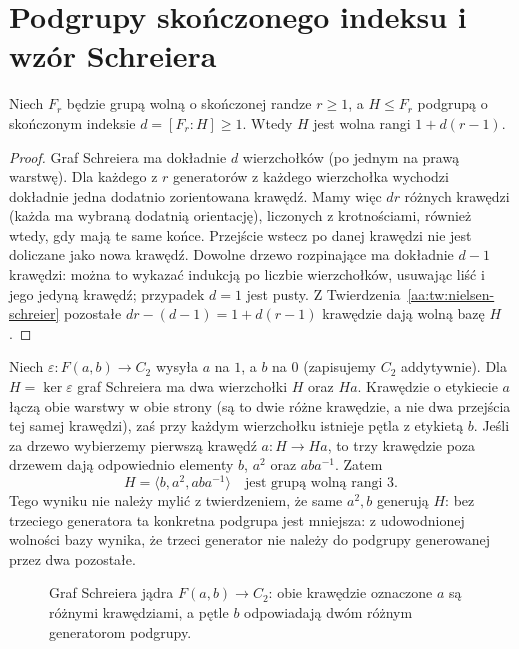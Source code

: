 \section{Podgrupy skończonego indeksu i wzór Schreiera}
\begin{twierdzenie}
\label{aa:tw:schreier-index}
Niech $F_r$ będzie grupą wolną o skończonej randze $r\ge1$,
a $H\le F_r$ podgrupą o skończonym indeksie
$d=[F_r:H]\ge1$. Wtedy $H$ jest wolna rangi
$1+d(r-1)$.
\end{twierdzenie}
\begin{proof}
Graf Schreiera ma dokładnie $d$ wierzchołków (po jednym
na prawą warstwę). Dla każdego z $r$ generatorów z każdego
wierzchołka wychodzi dokładnie jedna dodatnio zorientowana
krawędź. Mamy więc $dr$ różnych krawędzi (każda ma wybraną
dodatnią orientację), liczonych z krotnościami, również
wtedy, gdy mają te same końce. Przejście wstecz po danej
krawędzi nie jest doliczane jako nowa krawędź.
Dowolne drzewo rozpinające ma dokładnie $d-1$ krawędzi:
można to wykazać indukcją po liczbie wierzchołków, usuwając
liść i jego jedyną krawędź; przypadek $d=1$ jest pusty.
Z Twierdzenia~\ref{aa:tw:nielsen-schreier} pozostałe
$dr-(d-1)=1+d(r-1)$ krawędzie dają wolną bazę $H$.
\end{proof}

\begin{przyklad}
\label{aa:prz:schreier-index-two}
Niech $\varepsilon:F(a,b)\to C_2$ wysyła $a$ na $1$,
a $b$ na $0$ (zapisujemy $C_2$ addytywnie).
Dla $H=\ker\varepsilon$ graf Schreiera ma dwa wierzchołki
$H$ oraz $Ha$. Krawędzie o etykiecie $a$ łączą
obie warstwy w obie strony (są to dwie różne krawędzie,
a nie dwa przejścia tej samej krawędzi), zaś przy każdym
wierzchołku istnieje pętla
z etykietą $b$. Jeśli za drzewo wybierzemy pierwszą
krawędź $a:H\to Ha$, to trzy krawędzie poza drzewem
dają odpowiednio elementy $b$, $a^2$ oraz $aba^{-1}$.
Zatem
\[
H=\langle b,a^2,aba^{-1}\rangle
\quad\text{jest grupą wolną rangi }3.
\]
Tego wyniku nie należy mylić z twierdzeniem, że same
$a^2,b$ generują $H$: bez trzeciego generatora ta
konkretna podgrupa jest mniejsza: z udowodnionej wolności
bazy wynika, że trzeci generator nie należy do podgrupy
generowanej przez dwa pozostałe.
\end{przyklad}

\begin{figure}[ht]
\centering
{}
\caption{Graf Schreiera jądra $F(a,b)\to C_2$: obie krawędzie oznaczone $a$
są różnymi krawędziami, a pętle $b$ odpowiadają dwóm różnym generatorom podgrupy.}
\label{aa:fig:schreier-two}
\end{figure}

